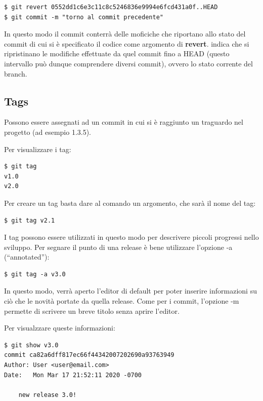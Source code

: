 \documentclass{article}
\begin{document}
\begin{verbatim}
$ git revert 0552dd1c6e3c11c8c5246836e9994e6fcd431a0f..HEAD
$ git commit -m "torno al commit precedente"
\end{verbatim}

In questo modo il commit  conterrà delle
moficiche che riportano allo stato del commit di cui si è specificato il codice
come argomento di \textbf{revert}.  indica che si ripristinano le modifiche
effettuate da quel commit fino a HEAD (questo intervallo può dunque comprendere
diversi commit), ovvero lo stato corrente del branch.

\subsection{Tags}
Possono essere assegnati ad un commit in cui si è raggiunto un traguardo nel
progetto (ad esempio 1.3.5).

Per visualizzare i tag:

\begin{verbatim}
$ git tag
v1.0
v2.0
\end{verbatim}

Per creare un tag basta dare al comando un argomento, che sarà il nome del tag:

\begin{verbatim}
$ git tag v2.1
\end{verbatim}

I tag possono essere utilizzati in questo modo per descrivere piccoli progressi
nello sviluppo. Per segnare il punto di una release è bene utilizzare l'opzione
-a (``annotated''): 

\begin{verbatim}
$ git tag -a v3.0
\end{verbatim}

In questo modo, verrà aperto l'editor di default per poter inserire informazioni
su ciò che le novità portate da quella release. Come per i commit, l'opzione -m
permette di scrivere un breve titolo senza aprire l'editor.

Per visualzzare queste informazioni:

\begin{verbatim}
$ git show v3.0
commit ca82a6dff817ec66f44342007202690a93763949
Author: User <user@email.com>
Date:   Mon Mar 17 21:52:11 2020 -0700

    new release 3.0!
\end{verbatim}
\end{document}
